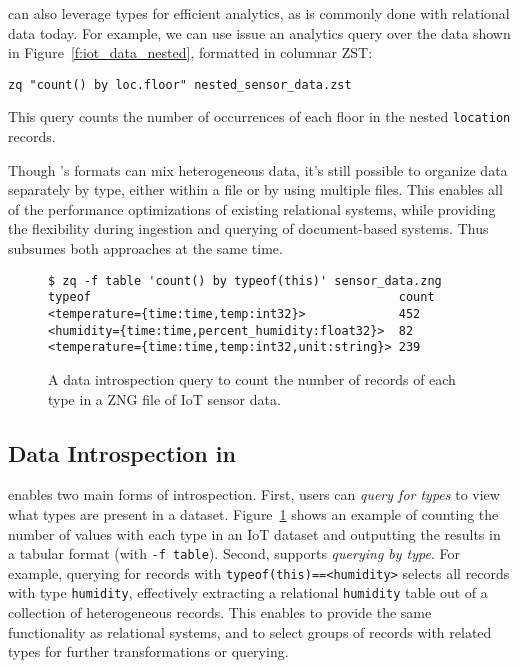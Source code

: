 \sys{} can also leverage types for efficient analytics, as is commonly done with relational data today. For example, we can use issue an analytics query over the data shown in Figure~\ref{f:iot_data_nested}, formatted in columnar ZST:

\texttt{zq "count() by loc.floor" nested\_sensor\_data.zst}

\noindent{}This query counts the number of occurrences of each floor in the nested \texttt{location} records.

Though \sys{}'s formats can mix heterogeneous data, it's still possible to organize data separately by type, either within a file or by using multiple files. This enables all of the performance optimizations of existing relational systems, while providing the flexibility during ingestion and querying of document-based systems. Thus \sys{} subsumes both approaches at the same time.



\begin{figure}
    \begin{verbatim}
$ zq -f table 'count() by typeof(this)' sensor_data.zng
typeof                                           count
<temperature={time:time,temp:int32}>             452
<humidity={time:time,percent_humidity:float32}>  82
<temperature={time:time,temp:int32,unit:string}> 239
    \end{verbatim}
    \vspace{-1.3em}
    \caption{A data introspection query to count the number of records of each type in a ZNG file of IoT sensor data. }
    \label{f:count_by_type}
    \vspace{-1.5em}
\end{figure}

\vspace{-0.9em}
\subsection{Data Introspection in \sys{}} \label{ss:zed_in_action_types}

\sys{} enables two main forms of introspection. First, users can {\em query for types} to view what types are present in a dataset. Figure~\ref{f:count_by_type} shows an example of counting the number of values with each type in an IoT dataset and outputting the results in a tabular format (with \texttt{-f table}). Second, \sys{} supports {\em querying by type}. For example, querying for records with \texttt{typeof(this)==<humidity>} selects all records with type \texttt{humidity}, effectively extracting a relational \texttt{humidity} table out of a collection of heterogeneous records.
This enables \sys{} to provide the same functionality as relational systems, and to select groups of records with related types for further transformations or querying.

